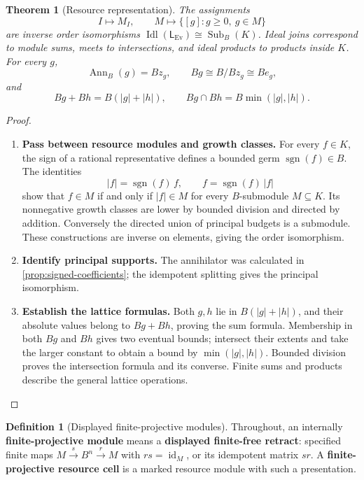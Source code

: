 \documentclass[11pt,a4paper]{article}
\numberwithin{algorithm}{section}
\numberwithin{equation}{section}
\newtheorem{theorem}{Theorem}[section]
\theoremstyle{definition}
\newtheorem{definition}[definition]{Definition}
\theoremstyle{remark}
\theoremstyle{plain}
\newcommand{\Idl}{\operatorname{Idl}}
\newcommand{\id}{\operatorname{id}}
\newcommand{\Sub}{\operatorname{Sub}}
\newcommand{\Ev}{{\operatorname{Ev}}}
\newcommand{\abs}[1]{\lvert #1\rvert}
\newcommand{\Ann}{\operatorname{Ann}}
\theoremstyle{definition}
\theoremstyle{plain}
\begin{document}
\begin{theorem}[Resource representation]\label{thm:signed-rep}
The assignments
\[
 I\longmapsto M_I,\qquad
 M\longmapsto\{[g]:g\ge0,\ g\in M\}
\]
are inverse order isomorphisms
$\Idl(\mathsf L_{\Ev})\cong\Sub_B(K)$.
Ideal joins correspond to module sums, meets to intersections,
and ideal products to products inside $K$.
For every $g$,
\[
 \Ann_B(g)=Bz_g,\qquad Bg\cong B/Bz_g\cong Be_g,
\]
and
\[
 Bg+Bh=B(\abs g+\abs h),\qquad
 Bg\cap Bh=B\min(\abs g,\abs h).
\]
\end{theorem}
\begin{proof}\leavevmode
\begin{enumerate}[leftmargin=*,align=left]
\item \textbf{Pass between resource modules and growth classes.}
For every $f\in K$, the sign of a rational representative defines
a bounded germ $\operatorname{sgn}(f)\in B$. The identities
\[
 |f|=\operatorname{sgn}(f)\,f,\qquad
 f=\operatorname{sgn}(f)\,|f|
\]
show that $f\in M$ if and only if $|f|\in M$ for every
$B$-submodule $M\subseteq K$.
Its nonnegative growth classes are lower by bounded division
and directed by addition. Conversely the directed union
of principal budgets is a submodule. These constructions are
inverse on elements, giving the order isomorphism.

\item \textbf{Identify principal supports.}
The annihilator was calculated in
\cref{prop:signed-coefficients}; the idempotent splitting gives
the principal isomorphism.

\item \textbf{Establish the lattice formulas.}
Both $g,h$ lie in $B(\abs g+\abs h)$, and their absolute values
belong to $Bg+Bh$, proving the sum formula. Membership in both
$Bg$ and $Bh$ gives two eventual bounds; intersect their extents
and take the larger constant to obtain a bound by
$\min(\abs g,\abs h)$. Bounded division proves the intersection
formula and its converse.
Finite sums and products describe the general lattice operations.
\end{enumerate}
\end{proof}


\begin{definition}[Displayed finite-projective modules]\label{def:finite-projective}
Throughout, an internally \textbf{finite-projective module} means a
\textbf{displayed finite-free retract}: specified finite maps
$M\xrightarrow{s}B^n\xrightarrow{r}M$ with $rs=\id_M$, or its
idempotent matrix $sr$. A \textbf{finite-projective resource cell}
is a marked resource module with such a presentation.
\end{definition}
\end{document}
